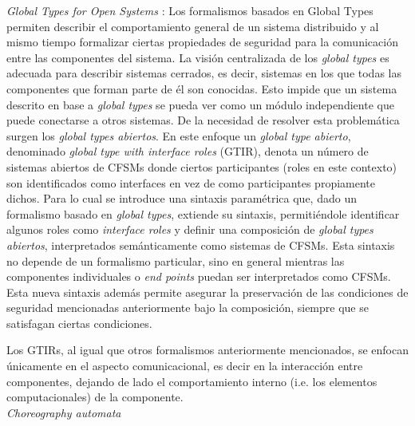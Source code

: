 \emph{Global Types for Open Systems} \cite{barbanera:eptcs279}: Los formalismos basados en Global Types permiten describir el comportamiento general de un sistema distribuido y al mismo tiempo formalizar ciertas propiedades de seguridad para la comunicación entre las componentes del sistema. La visión centralizada de los \emph{global types} es adecuada para describir sistemas cerrados, es decir, sistemas en los que todas las componentes que forman parte de él son conocidas. Esto impide que un sistema descrito en base a \emph{global types} se pueda ver como un módulo independiente que puede conectarse a otros sistemas. De la necesidad de resolver esta problemática surgen los \emph{global types abiertos}. En este enfoque un \emph{global type abierto}, denominado \emph{global type with interface roles} (GTIR), denota un número de sistemas abiertos de CFSMs donde ciertos participantes (roles en este contexto) son identificados como interfaces en vez de como participantes propiamente dichos. Para lo cual se introduce una sintaxis paramétrica que, dado un formalismo basado en \emph{global types}, extiende su sintaxis, permitiéndole identificar algunos roles como \emph{interface roles} y definir una composición de \emph{global types abiertos}, interpretados semánticamente como sistemas de CFSMs. Esta sintaxis no depende de un formalismo particular, sino en general mientras las componentes individuales o \emph{end points} puedan ser interpretados como CFSMs. Esta nueva sintaxis además permite asegurar la preservación de las condiciones de seguridad mencionadas anteriormente bajo la composición, siempre que se satisfagan ciertas condiciones.

Los GTIRs, al igual que otros formalismos anteriormente mencionados, se enfocan únicamente en el aspecto comunicacional, es decir en la interacción entre componentes, dejando de lado el comportamiento interno (i.e. los elementos computacionales) de la componente.\\

\emph{Choreography automata} \cite{---}

